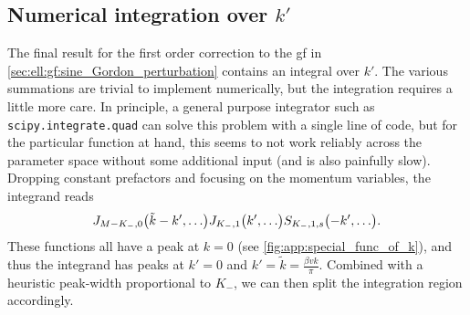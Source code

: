 \subsection{Numerical integration over \texorpdfstring{$k'$}{kprime}}\label{sec:app:numerical_int_kp}
The final result for the first order correction to the \gls{gf} in \autoref{sec:ell:gf:sine_Gordon_perturbation} contains an integral over $k'$.
The various summations are trivial to implement numerically, but the integration requires a little more care.
In principle, a general purpose integrator such as \texttt{scipy.integrate.quad} \cite{Scipy_2020} can solve this problem with a single line of code, but for the particular function at hand, this seems to not work reliably across the parameter space without some additional input (and is also painfully slow).
Dropping constant prefactors and focusing on the momentum variables, the integrand reads
\begin{align*}
J_{M-K_-,0}\kla[\big]{\tilde{k} - k', \dots} J_{K_-,1}\kla[\big]{k', \dots} S_{K_-,1,s}\kla[\big]{-k',\dots}.
\end{align*}
These functions all have a peak at $k=0$ (see \autoref{fig:app:special_func_of_k}), and thus the integrand has peaks at $k'=0$ and $k'=\tilde{k} = \frac{\beta vk}{\pi}$.
Combined with a heuristic peak-width proportional to $K_-$, we can then split the integration region accordingly.\newpage

